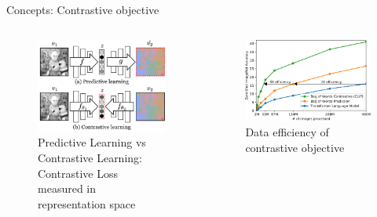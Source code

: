 \documentclass[xcolor=dvipsnames]{beamer}
\begin{document}
\begin{frame}{Concepts: Contrastive objective}
  \begin{columns}
    \begin{column}{0.5\textwidth}
      \begin{figure}[ht]
        \centering
        \includegraphics[width=0.9\linewidth]{../../figures/02-04-text-support-img/tian-predictive-vs-contrastive}
        \caption{Predictive Learning vs Contrastive Learning: Contrastive Loss measured in representation space \parencite{tian2020contrastive}}
      \end{figure}
    \end{column}

    \begin{column}{0.5\textwidth}
      \begin{figure}[ht]
        \centering
        \includegraphics[width=0.9\linewidth]{../../figures/02-04-text-support-img/data-efficiency}
        \caption{Data efficiency of contrastive objective \parencite{radford2021learning}}
      \end{figure}
    \end{column}
  \end{columns}
\end{frame}
\end{document}

